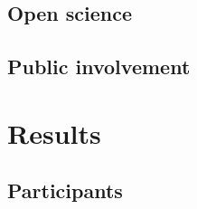 \documentclass{article}
\begin{document}
\subsection{Open science}\label{sec:open_science}






\subsection{Public involvement}\label{sec:public_involvement}

\section{Results}\label{sec:results}
\subsection{Participants}\label{sec:participants}


\end{document}
